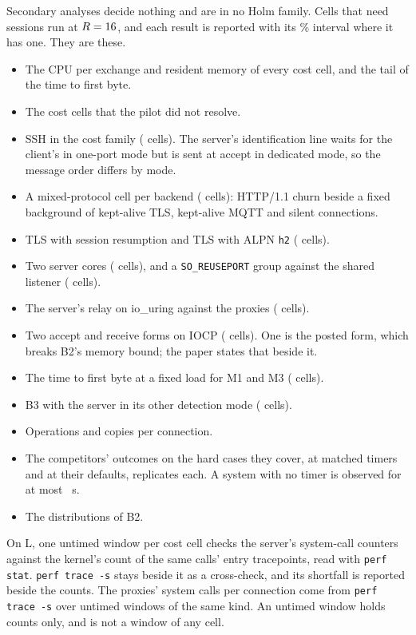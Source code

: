 Secondary analyses decide nothing and are in no Holm family. Cells that need sessions run at $R =
16$, and each result is reported with its \CiPct\% interval where it has one.
They are these.
\begin{itemize}
\item The CPU per exchange and resident memory of every cost cell, and the tail of the time to
first byte.
\item The cost cells that the pilot did not resolve.
\item SSH in the cost family (\SshSecCells{} cells). The server's identification line waits for
the client's in one-port mode but is sent at accept in dedicated mode, so the message order
differs by mode.
\item A mixed-protocol cell per backend (\MixedSecCells{} cells): HTTP/1.1 churn beside a fixed
background of \NBg{} kept-alive TLS, \NBg{} kept-alive MQTT and \NBg{} silent connections.
\item TLS with session resumption and TLS with ALPN \texttt{h2} (\TlsSecCells{} cells).
\item Two server cores (\TwoCoreSecCells{} cells), and a \texttt{SO\_REUSEPORT} group against the
shared listener (\ReuseportSecCells{} cells).
\item The server's relay on io\_uring against the proxies (\RelaySecCells{} cells).
\item Two accept and receive forms on IOCP (\IocpSecCells{} cells). One is the posted form, which
breaks B2's memory bound; the paper states that beside it.
\item The time to first byte at a fixed load for M1 and M3 (\TtfbSecCells{} cells).
\item B3 with the server in its other detection mode (\OtherModeSecCells{} cells).
\item Operations and copies per connection.
\item The competitors' outcomes on the hard cases they cover, at matched timers and at their
defaults, \CompReps{} replicates each. A system with no timer is observed for at most
\TObsS{}~s.
\item The distributions of B2.
\end{itemize}

On L, one untimed window per cost cell checks the server's system-call counters against the
kernel's count of the same calls' entry tracepoints, read with \texttt{perf stat}. \texttt{perf
trace -s} stays beside it as a cross-check, and its shortfall is reported beside the counts. The
proxies' system calls per connection come from \texttt{perf trace -s} over untimed windows of the
same kind. An untimed window holds counts only, and is not a window of any cell.

